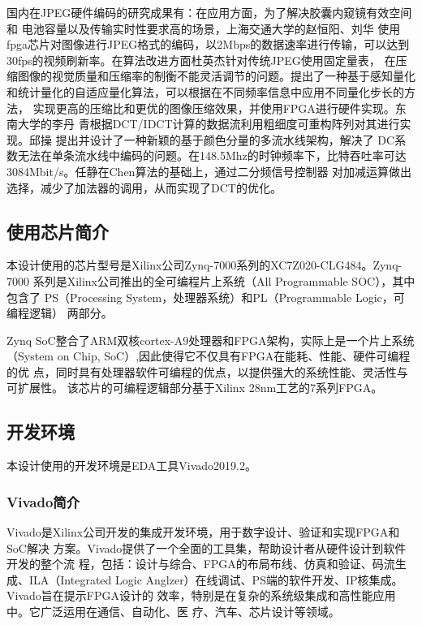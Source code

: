\documentclass{article}
\numberwithin {equation}{section}
\begin{document}
\begin{spacing}{1.25}
    国内在JPEG硬件编码的研究成果有：在应用方面，为了解决胶囊内窥镜有效空间和
    电池容量以及传输实时性要求高的场景，上海交通大学的赵恒阳、刘华\cite{ref1}
    使用fpga芯片对图像进行JPEG格式的编码，以2Mbps的数据速率进行传输，可以达到
    30fps的视频刷新率。在算法改进方面杜英杰\cite{ref2}针对传统JPEG使用固定量表，
    在压缩图像的视觉质量和压缩率的制衡不能灵活调节的问题。提出了一种基于感知量化
    和统计量化的自适应量化算法，可以根据在不同频率信息中应用不同量化步长的方法，
    实现更高的压缩比和更优的图像压缩效果，并使用FPGA进行硬件实现。东南大学的李丹
    青\cite{可重构}根据DCT/IDCT计算的数据流利用粗细度可重构阵列对其进行实现。邱操
    \cite{1019687658.nh}提出并设计了一种新颖的基于颜色分量的多流水线架构，解决了
    DC系数无法在单条流水线中编码的问题。在148.5Mhz的时钟频率下，比特吞吐率可达
    3084Mbit/s。任静\cite{1020391053.nh}在Chen算法的基础上，通过二分频信号控制器
    对加减运算做出选择，减少了加法器的调用，从而实现了DCT的优化。
  \subsection{使用芯片简介}
    \vspace{1em}
    本设计使用的芯片型号是Xilinx公司Zynq-7000系列的XC7Z020-CLG484。Zynq-7000
    系列是Xilinx公司推出的全可编程片上系统（All Programmable SOC），其中包含了
    PS（Processing System，处理器系统）和PL（Programmable Logic，可编程逻辑）
    两部分。

    Zynq SoC整合了ARM双核cortex-A9处理器和FPGA架构，实际上是一个片上系统
    （System on Chip, SoC）,因此使得它不仅具有FPGA在能耗、性能、硬件可编程的优
    点，同时具有处理器软件可编程的优点，以提供强大的系统性能、灵活性与可扩展性。
    该芯片的可编程逻辑部分基于Xilinx 28nm工艺的7系列FPGA。
  \subsection{开发环境}
    本设计使用的开发环境是EDA工具Vivado2019.2。
    \subsubsection{Vivado简介}
    \vspace{1em}
      Vivado是Xilinx公司开发的集成开发环境，用于数字设计、验证和实现FPGA和SoC解决
      方案。Vivado提供了一个全面的工具集，帮助设计者从硬件设计到软件开发的整个流
      程，包括：设计与综合、FPGA的布局布线、仿真和验证、码流生成、ILA（Integrated
       Logic Anglzer）在线调试、PS端的软件开发、IP核集成。Vivado旨在提示FPGA设计的
       效率，特别是在复杂的系统级集成和高性能应用中。它广泛运用在通信、自动化、医
       疗、汽车、芯片设计等领域。


\end{spacing}
\end{document}
